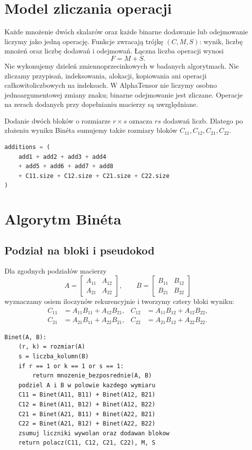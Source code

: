 \documentclass[11pt,a4paper]{article}
\begin{document}
\section{Model zliczania operacji}
Każde mnożenie dwóch skalarów oraz każde binarne dodawanie lub odejmowanie
liczymy jako jedną operację. Funkcje zwracają trójkę
$(C,M,S)$: wynik, liczbę mnożeń oraz liczbę dodawań i odejmowań.
Łączna liczba operacji wynosi
\[
  F=M+S.
\]
Nie wykonujemy dzieleń zmiennoprzecinkowych w badanych algorytmach.
Nie zliczamy przypisań, indeksowania, alokacji, kopiowania ani operacji
całkowitoliczbowych na indeksach. W AlphaTensor nie liczymy osobno
jednoargumentowej zmiany znaku; binarne odejmowanie jest zliczane.
Operacje na zerach dodanych przy dopełnianiu macierzy są uwzględniane.

Dodanie dwóch bloków o rozmiarze $r\times s$ oznacza $rs$ dodawań
liczb. Dlatego po złożeniu wyniku Binéta sumujemy także rozmiary
bloków $C_{11},C_{12},C_{21},C_{22}$.

\begin{lstlisting}[language=Python,caption={Zliczanie dodawań w jednym kroku Binéta.}]
additions = (
    add1 + add2 + add3 + add4
    + add5 + add6 + add7 + add8
    + C11.size + C12.size + C21.size + C22.size
)
\end{lstlisting}

\section{Algorytm Binéta}
\subsection{Podział na bloki i pseudokod}
Dla zgodnych podziałów macierzy
\[
A=\begin{bmatrix}A_{11}&A_{12}\\A_{21}&A_{22}\end{bmatrix},\qquad
B=\begin{bmatrix}B_{11}&B_{12}\\B_{21}&B_{22}\end{bmatrix}
\]
wyznaczamy osiem iloczynów rekurencyjnie i tworzymy cztery bloki wyniku:
\begin{align*}
C_{11}&=A_{11}B_{11}+A_{12}B_{21}, &
C_{12}&=A_{11}B_{12}+A_{12}B_{22},\\
C_{21}&=A_{21}B_{11}+A_{22}B_{21}, &
C_{22}&=A_{21}B_{12}+A_{22}B_{22}.
\end{align*}

\begin{lstlisting}[caption={Pseudokod Binéta dla zgodnych macierzy prostokątnych.}]
Binet(A, B):
    (r, k) = rozmiar(A)
    s = liczba_kolumn(B)
    if r == 1 or k == 1 or s == 1:
        return mnozenie_bezposrednie(A, B)
    podziel A i B w polowie kazdego wymiaru
    C11 = Binet(A11, B11) + Binet(A12, B21)
    C12 = Binet(A11, B12) + Binet(A12, B22)
    C21 = Binet(A21, B11) + Binet(A22, B21)
    C22 = Binet(A21, B12) + Binet(A22, B22)
    zsumuj liczniki wywolan oraz dodawan blokow
    return polacz(C11, C12, C21, C22), M, S
\end{lstlisting}
\end{document}
